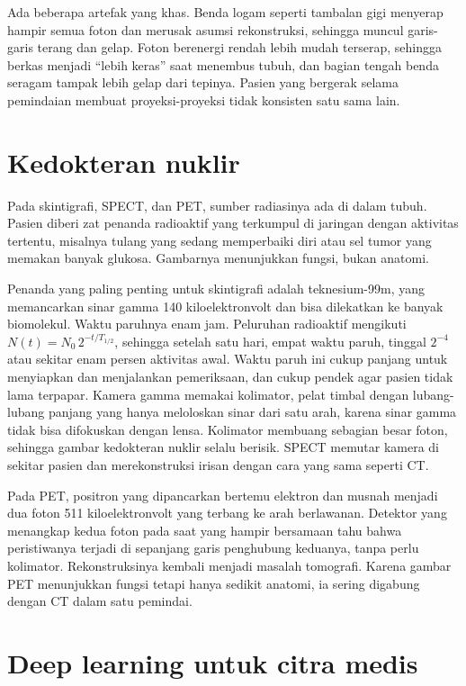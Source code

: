Ada beberapa artefak yang khas. Benda logam seperti tambalan gigi menyerap hampir semua foton dan merusak asumsi
rekonstruksi, sehingga muncul garis-garis terang dan gelap. Foton berenergi rendah lebih mudah terserap, sehingga berkas
menjadi ``lebih keras'' saat menembus tubuh, dan bagian tengah benda seragam tampak lebih gelap dari tepinya. Pasien yang
bergerak selama pemindaian membuat proyeksi-proyeksi tidak konsisten satu sama lain.

\section{Kedokteran nuklir}

Pada skintigrafi, SPECT, dan PET, sumber radiasinya ada di dalam tubuh. Pasien diberi zat penanda radioaktif yang terkumpul
di jaringan dengan aktivitas tertentu, misalnya tulang yang sedang memperbaiki diri atau sel tumor yang memakan banyak
glukosa. Gambarnya menunjukkan fungsi, bukan anatomi.

Penanda yang paling penting untuk skintigrafi adalah teknesium-99m, yang memancarkan sinar gamma 140 kiloelektronvolt dan
bisa dilekatkan ke banyak biomolekul. Waktu paruhnya enam jam. Peluruhan radioaktif mengikuti $N(t)=N_0\,2^{-t/T_{1/2}}$,
sehingga setelah satu hari, empat waktu paruh, tinggal $2^{-4}$ atau sekitar enam persen aktivitas awal. Waktu paruh ini
cukup panjang untuk menyiapkan dan menjalankan pemeriksaan, dan cukup pendek agar pasien tidak lama terpapar. Kamera gamma
memakai kolimator, pelat timbal dengan lubang-lubang panjang yang hanya meloloskan sinar dari satu arah, karena sinar gamma
tidak bisa difokuskan dengan lensa. Kolimator membuang sebagian besar foton, sehingga gambar kedokteran nuklir selalu
berisik. SPECT memutar kamera di sekitar pasien dan merekonstruksi irisan dengan cara yang sama seperti CT.

Pada PET, positron yang dipancarkan bertemu elektron dan musnah menjadi dua foton 511 kiloelektronvolt yang terbang ke arah
berlawanan. Detektor yang menangkap kedua foton pada saat yang hampir bersamaan tahu bahwa peristiwanya terjadi di sepanjang
garis penghubung keduanya, tanpa perlu kolimator. Rekonstruksinya kembali menjadi masalah tomografi. Karena gambar PET
menunjukkan fungsi tetapi hanya sedikit anatomi, ia sering digabung dengan CT dalam satu pemindai.

\section{Deep learning untuk citra medis}

